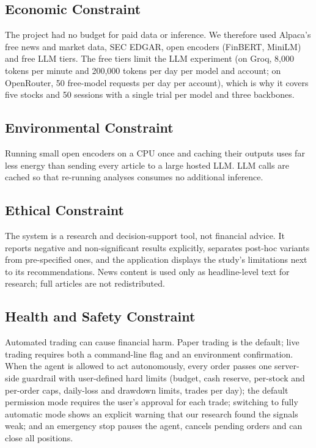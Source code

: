 \subsection{Economic Constraint}
The project had no budget for paid data or inference. We therefore used Alpaca's free news and market data, SEC EDGAR, open encoders (FinBERT, MiniLM) and free LLM tiers. The free tiers limit the LLM experiment (on Groq, 8{,}000 tokens per minute and 200{,}000 tokens per day per model and account; on OpenRouter, 50 free-model requests per day per account), which is why it covers five stocks and 50 sessions with a single trial per model and three backbones.

\subsection{Environmental Constraint}
Running small open encoders on a CPU once and caching their outputs uses far less energy than sending every article to a large hosted LLM. LLM calls are cached so that re-running analyses consumes no additional inference.

\subsection{Ethical Constraint}
The system is a research and decision-support tool, not financial advice. It reports negative and non-significant results explicitly, separates post-hoc variants from pre-specified ones, and the application displays the study's limitations next to its recommendations. News content is used only as headline-level text for research; full articles are not redistributed.

\subsection{Health and Safety Constraint}
Automated trading can cause financial harm. Paper trading is the default; live trading requires both a command-line flag and an environment confirmation. When the agent is allowed to act autonomously, every order passes one server-side guardrail with user-defined hard limits (budget, cash reserve, per-stock and per-order caps, daily-loss and drawdown limits, trades per day); the default permission mode requires the user's approval for each trade; switching to fully automatic mode shows an explicit warning that our research found the signals weak; and an emergency stop pauses the agent, cancels pending orders and can close all positions.

